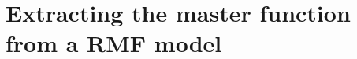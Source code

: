 \documentclass[usenatbib]{mnras}
\begin{document}


\section{Extracting the master function from a RMF model}
\label{CconRMF}

\end{document}

